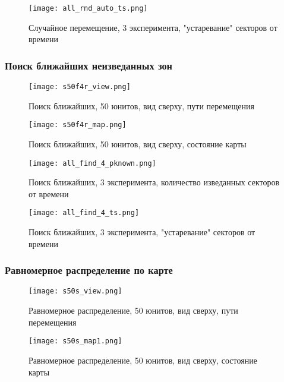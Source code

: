 \begin{figure}[h!]
    \centering
    \texttt{[image: all\_rnd\_auto\_ts.png]}
    \caption{Случайное перемещение, 3 эксперимента, "устаревание" секторов от времени}
\end{figure}

\clearpage
\newpage

\subsubsection{Поиск ближайших неизведанных зон}

\begin{figure}[h!]
    \centering
    \texttt{[image: s50f4r\_view.png]}
    \caption{Поиск ближайших, 50 юнитов, вид сверху, пути перемещения}
\end{figure}

\begin{figure}[h!]
    \centering
    \texttt{[image: s50f4r\_map.png]}
    \caption{Поиск ближайших, 50 юнитов, вид сверху, состояние карты}
\end{figure}

\begin{figure}[h!]
    \centering
    \texttt{[image: all\_find\_4\_pknown.png]}
    \caption{Поиск ближайших, 3 эксперимента, количество изведанных секторов от времени}
\end{figure}

\begin{figure}[h!]
    \centering
    \texttt{[image: all\_find\_4\_ts.png]}
    \caption{Поиск ближайших, 3 эксперимента, "устаревание" секторов от времени}
\end{figure}

\clearpage
\newpage

\subsubsection{Равномерное распределение по карте}

\begin{figure}[h!]
    \centering
    \texttt{[image: s50s\_view.png]}
    \caption{Равномерное распределение, 50 юнитов, вид сверху, пути перемещения}
\end{figure}

\begin{figure}[h!]
    \centering
    \texttt{[image: s50s\_map1.png]}
    \caption{Равномерное распределение, 50 юнитов, вид сверху, состояние карты}
\end{figure}

